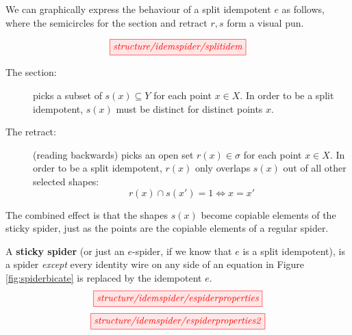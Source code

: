 
\begin{fullwidth}

 We can graphically express the behaviour of a split idempotent $e$ as follows, where the semicircles for the section and retract $r,s$ form a visual pun.

\[\scalebox{1}{\tikzfig{structure/idemspider/splitidem}}\]

\begin{description}
\item[The section:]{picks a subset of $s(x) \subseteq Y$ for each point $x \in X$. In order to be a split idempotent, $s(x)$ must be distinct for distinct points $x$.}
\item[The retract:]{(reading backwards) picks an open set $r(x) \in \sigma$ for each point $x \in X$. In order to be a split idempotent, $r(x)$ only overlaps $s(x)$ out of all other selected shapes: \[r(x) \cap s(x') = 1 \iff x = x'\]}
\end{description}
The combined effect is that the shapes $s(x)$ become copiable elements of the sticky spider, just as the points are the copiable elements of a regular spider.

\begin{defn}
A \textbf{sticky spider} (or just an $e$-spider, if we know that $e$ is a split idempotent), is a spider \emph{except} every identity wire on any side of an equation in Figure \ref{fig:spiderbicate} is replaced by the idempotent $e$.
\[\scalebox{1}{\tikzfig{structure/idemspider/espiderproperties}}\]
\[\scalebox{1}{\tikzfig{structure/idemspider/espiderproperties2}}\]


\end{defn}
\end{fullwidth}
